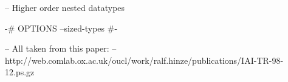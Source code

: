 -- Higher order nested datatypes

{-# OPTIONS --sized-types #-}

-- All taken from this paper:
--  http://web.comlab.ox.ac.uk/oucl/work/ralf.hinze/publications/IAI-TR-98-12.ps.gz

\begin{code}%
\>\<%
\\
\>  \<%
\\
%
\\
\>[0]\<[2]%
\>[2]  \<%
\\
%
\\
\>[2]\<[4]%
\>[4]  \AgdaSymbol{(} \AgdaSymbol{:} \AgdaSymbol{)} \AgdaSymbol{:}  \<%
\\
\>[4]\<[6]%
\>[6] \AgdaSymbol{:}    \<%
\\
\>[4]\<[6]%
\>[6] \AgdaSymbol{:}        \<%
\\
%
\\
\>[0]\<[2]%
\>[2]  \<%
\\
%
\\
\>[2]\<[4]%
\>[4]  \AgdaSymbol{(} \AgdaSymbol{:} \AgdaSymbol{)} \AgdaSymbol{:}  \<%
\\
\>[4]\<[6]%
\>[6] \AgdaSymbol{:}    \<%
\\
%
\\
\>[0]\<[4]%
\>[4]  \AgdaSymbol{(} \AgdaSymbol{:}   \AgdaSymbol{)(} \AgdaSymbol{:} \AgdaSymbol{)} \AgdaSymbol{:}  \<%
\\
\>[4]\<[6]%
\>[6] \AgdaSymbol{:} \AgdaSymbol{(} \AgdaSymbol{)}  \AgdaSymbol{(} \AgdaSymbol{)}    \<%

\end{code}
